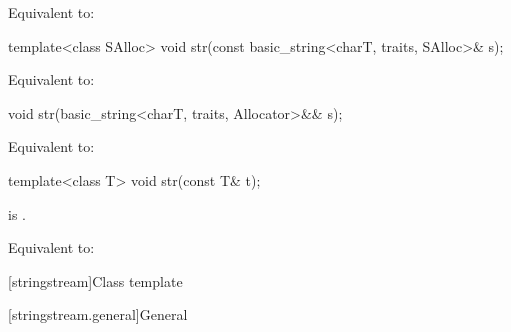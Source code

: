 \begin{itemdescr}
\pnum
\effects
Equivalent to: 
\end{itemdescr}

%
\begin{itemdecl}
template<class SAlloc>
  void str(const basic_string<charT, traits, SAlloc>& s);
\end{itemdecl}

\begin{itemdescr}
\pnum
\effects
Equivalent to: 
\end{itemdescr}

%
\begin{itemdecl}
void str(basic_string<charT, traits, Allocator>&& s);
\end{itemdecl}

\begin{itemdescr}
\pnum
\effects
Equivalent to: 
\end{itemdescr}

%
\begin{itemdecl}
template<class T>
  void str(const T& t);
\end{itemdecl}

\begin{itemdescr}
\pnum
\constraints
{}
is .

\pnum
\effects
Equivalent to: 
\end{itemdescr}

[stringstream]{Class template }

[stringstream.general]{General}

